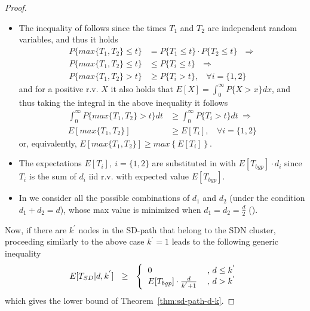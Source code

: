 \begin{proof}
\begin{itemize}
\item The inequality of  follows since the times $T_{1}$ and $T_{2}$ are independent random variables, and thus it holds
\begin{align*}
P\{max\{T_{1},T_{2}\}\leq t\} 	&= P\{T_{1}\leq t\}\cdot P\{T_{2}\leq t\}~~~\Rightarrow\\
P\{max\{T_{1},T_{2}\}\leq t\} 	&\leq P\{T_{i}\leq t\}~~~\Rightarrow\\
P\{max\{T_{1},T_{2}\}> t\} 		&\geq P\{T_{i}> t\},~~~~\forall i=\{1,2\}
\end{align*}
and for a positive r.v. $X$ it also holds that $E[X]=\int_{0}^{\infty}P\{X>x\}dx$, and thus taking the integral in the above inequality it follows
\begin{align*}
\int_{0}^{\infty}P\{max\{T_{1},T_{2}\}> t\}dt 	&\geq \int_{0}^{\infty}P\{T_{i}> t\}dt~\Rightarrow\\
E[max\{T_{1},T_{2}\}] 						&\geq E[T_{i}],~~~~\forall i=\{1,2\}
\end{align*}
or, equivalently, $E[max\{T_{1},T_{2}\}] \geq max\left\{E[T_{i}]\right\}$.

\item The expectations $E[T_{i}], ~i=\{1,2\}$ are substituted in  with $E[T_{bgp}]\cdot d_{i}$ since $T_{i}$ is the sum of $d_{i}$ iid r.v. with expected value $E[T_{bgp}]$.

\item In  we consider all the possible combinations of $d_{1}$ and $d_{2}$ (under the condition $d_{1}+d_{2}=d$), whose max value is minimized when $d_{1}=d_{2}=\frac{d}{2}$ ().
\end{itemize}

Now, if there are $k^{'}$ nodes in the SD-path that belong to the SDN cluster, proceeding similarly to the above case $k^{'}=1$ leads to the following generic inequality
\begin{equation}
E[T_{SD}|d,k^{'}] ~~\geq~~ \left\{
\begin{tabular}{lc}
$ 0$				&, $d\leq k^{'}$\\
$ E[T_{bgp}]\cdot \frac{d}{k^{'}+1}$	&, $d>k^{'}$
\end{tabular}
\right.
\end{equation}
which gives the lower bound of Theorem~\ref{thm:sd-path-d-k}.



\end{proof}
